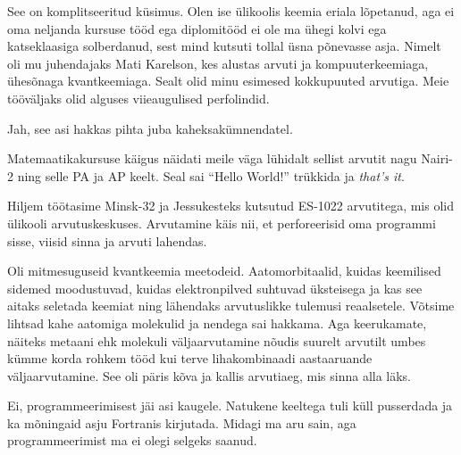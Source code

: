 \label{chptr:lucifer}


See on komplitseeritud küsimus. Olen ise ülikoolis keemia eriala lõpetanud, aga ei oma neljanda kursuse tööd ega 
diplomitööd ei ole ma ühegi kolvi ega katseklaasiga solberdanud, sest mind 
kutsuti tollal üsna põnevasse asja. Nimelt oli mu juhendajaks Mati 
Karelson, kes alustas arvuti ja kompuuterkeemiaga, 
ühesõnaga kvantkeemiaga. Sealt olid minu esimesed kokkupuuted arvutiga. Meie 
tööväljaks olid alguses viieaugulised perfolindid. 


Jah, see asi hakkas pihta juba kaheksakümnendatel.


Matemaatikakursuse käigus näidati meile väga lühidalt sellist arvutit 
nagu Nairi-2 ning selle PA ja AP keelt. Seal sai \enquote{Hello World!} trükkida ja 
\emph{that's it}. 

Hiljem töötasime 
Minsk-32 ja Jessukesteks kutsutud ES-1022 arvutitega, mis olid ülikooli 
arvutuskeskuses. Arvutamine käis nii, et perforeerisid oma programmi sisse, 
viisid sinna ja arvuti lahendas. 


Oli mitmesuguseid kvantkeemia meetodeid. Aatomorbitaalid, kuidas 
keemilised sidemed moodustuvad, kuidas elektronpilved suhtuvad üksteisega ja 
kas see aitaks seletada keemiat ning lähendaks arvutuslikke tulemusi 
reaalsetele. Võtsime lihtsad kahe aatomiga 
molekulid ja nendega sai hakkama. Aga keerukamate, näiteks metaani 
ehk  molekuli väljaarvutamine nõudis suurelt arvutilt umbes kümme 
korda rohkem tööd kui terve lihakombinaadi aastaaruande väljaarvutamine. See 
oli päris kõva ja kallis arvutiaeg, mis sinna alla läks.


Ei, programmeerimisest jäi asi kaugele. Natukene keeltega tuli küll
pusserdada ja ka mõningaid asju Fortranis 
kirjutada. Midagi ma aru sain, aga programmeerimist ma ei 
olegi selgeks saanud. 

